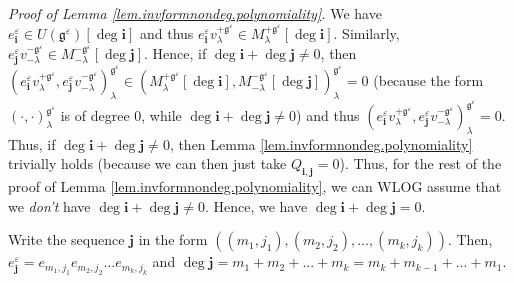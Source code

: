 \documentclass[etingof-lie.tex]{subfiles}
\begin{document}
\textit{Proof of Lemma \ref{lem.invformnondeg.polynomiality}.} We have
$e_{\mathbf{i}}^{\varepsilon}\in U\left(  \mathfrak{g}^{\varepsilon}\right)
\left[  \deg\mathbf{i}\right]  $ and thus $e_{\mathbf{i}}^{\varepsilon
}v_{\lambda}^{+\mathfrak{g}^{\varepsilon}}\in M_{\lambda}^{+\mathfrak{g}%
^{\varepsilon}}\left[  \deg\mathbf{i}\right]  $. Similarly, $e_{\mathbf{j}%
}^{\varepsilon}v_{-\lambda}^{-\mathfrak{g}^{\varepsilon}}\in M_{-\lambda
}^{-\mathfrak{g}^{\varepsilon}}\left[  \deg\mathbf{j}\right]  $. Hence, if
$\deg\mathbf{i}+\deg\mathbf{j}\neq0$, then $\left(  e_{\mathbf{i}%
}^{\varepsilon}v_{\lambda}^{+\mathfrak{g}^{\varepsilon}},e_{\mathbf{j}%
}^{\varepsilon}v_{-\lambda}^{-\mathfrak{g}^{\varepsilon}}\right)  _{\lambda
}^{\mathfrak{g}^{\varepsilon}}\in\left(  M_{\lambda}^{+\mathfrak{g}%
^{\varepsilon}}\left[  \deg\mathbf{i}\right]  ,M_{-\lambda}^{-\mathfrak{g}%
^{\varepsilon}}\left[  \deg\mathbf{j}\right]  \right)  _{\lambda
}^{\mathfrak{g}^{\varepsilon}}=0$ (because the form $\left(  \cdot
,\cdot\right)  _{\lambda}^{\mathfrak{g}^{\varepsilon}}$ is of degree $0$,
while $\deg\mathbf{i}+\deg\mathbf{j}\neq0$) and thus $\left(  e_{\mathbf{i}%
}^{\varepsilon}v_{\lambda}^{+\mathfrak{g}^{\varepsilon}},e_{\mathbf{j}%
}^{\varepsilon}v_{-\lambda}^{-\mathfrak{g}^{\varepsilon}}\right)  _{\lambda
}^{\mathfrak{g}^{\varepsilon}}=0$. Thus, if $\deg\mathbf{i}+\deg\mathbf{j}%
\neq0$, then Lemma \ref{lem.invformnondeg.polynomiality} trivially holds
(because we can then just take $Q_{\mathbf{i},\mathbf{j}}=0$). Thus, for the
rest of the proof of Lemma \ref{lem.invformnondeg.polynomiality}, we can WLOG
assume that we \textit{don't} have $\deg\mathbf{i}+\deg\mathbf{j}\neq0$.
Hence, we have $\deg\mathbf{i}+\deg\mathbf{j}=0$.

Write the sequence $\mathbf{j}$ in the form $\left(  \left(  m_{1}%
,j_{1}\right)  ,\left(  m_{2},j_{2}\right)  ,...,\left(  m_{k},j_{k}\right)
\right)  $. Then, $e_{\mathbf{j}}^{\varepsilon}=e_{m_{1},j_{1}}e_{m_{2},j_{2}%
}...e_{m_{k},j_{k}}$ and $\deg\mathbf{j}=m_{1}+m_{2}+...+m_{k}=m_{k}%
+m_{k-1}+...+m_{1}$.
\end{document}
